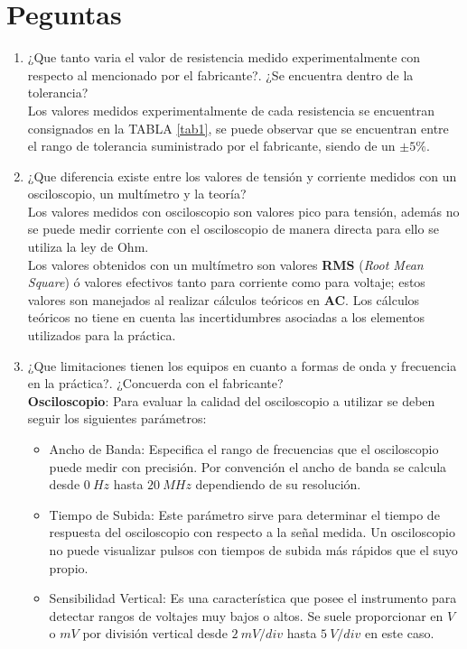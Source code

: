 \documentclass[twocolumn]{IEEEtran}
\begin{document}
\section{Peguntas}
\begin{enumerate}
  \item ¿Que tanto varia el valor de resistencia medido experimentalmente con
respecto al mencionado por el fabricante?. ¿Se encuentra dentro de la
tolerancia?\\
Los valores medidos experimentalmente de cada resistencia se encuentran
consignados en la TABLA \ref{tab1}, se puede observar que se encuentran entre el
rango de tolerancia suministrado por el fabricante, siendo de un $\pm 5\%$.
  \item ¿Que diferencia existe entre los valores de tensión y corriente medidos
con un osciloscopio, un multímetro y la teoría?\\
Los valores medidos con osciloscopio son valores pico para tensión, además no se
puede medir corriente con el osciloscopio de manera directa para ello se utiliza
la ley de Ohm.\\
Los valores obtenidos con un multímetro son valores \textbf{RMS} (\textit{Root
Mean Square}) ó valores efectivos tanto para corriente como para voltaje; estos
valores son manejados al realizar cálculos teóricos en \textbf{AC}. Los cálculos
teóricos no tiene en cuenta las incertidumbres asociadas a los elementos
utilizados para la práctica.
  \item ¿Que limitaciones tienen los equipos en cuanto a formas de onda y
frecuencia en la práctica?. ¿Concuerda con el fabricante?\\
\textbf{Osciloscopio}: Para evaluar la calidad del osciloscopio a utilizar se
deben seguir los siguientes parámetros:
\begin{itemize}
 \item Ancho de Banda: Especifica el rango de frecuencias que el osciloscopio
puede medir con precisión. Por convención el ancho de banda se calcula desde $0
\ Hz$ hasta $20 \ MHz$ dependiendo de su resolución.
 \item Tiempo de Subida: Este parámetro sirve para determinar el tiempo de
respuesta del osciloscopio con respecto a la señal medida. Un osciloscopio no
puede visualizar pulsos con tiempos de subida más rápidos que el suyo propio.
 \item Sensibilidad Vertical: Es una característica que posee el instrumento
para detectar rangos de voltajes muy bajos o altos. Se suele proporcionar en $V$
o $mV$ por división vertical desde $2 \ mV/div$ hasta $5 \ V/div$ en este caso.

\end{itemize}
\end{enumerate}
\end{document}
